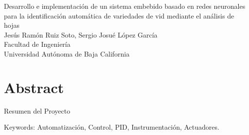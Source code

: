 Desarrollo e implementación de un sistema embebido basado en redes neuronales para la identificación automática de variedades de vid mediante el análisis de hojas\\
Jesús Ramón Ruiz Soto, Sergio Josué López García\\
Facultad de Ingeniería\\
Universidad Autónoma de Baja California \setlength{\parskip}{0.5cm}

\thispagestyle{plain}			%
\setlength{\parskip}{0pt plus 1.0pt}
\section*{Abstract}
Resumen del Proyecto

\vfill
Keywords: Automatización, Control, PID, Instrumentación, Actuadores.

\thispagestyle{empty}
\mbox{}